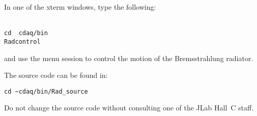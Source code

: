 {In one of the xterm windows, type the following:

\texttt{\\
	cd ~cdaq/bin\\
	Radcontrol\\
}

and use the menu session to control the motion of the
Bremsstrahlung radiator.

The source code can be found in:

\texttt{cd \textasciitilde{}cdaq/bin/Rad\_source}

Do not change the source code without consulting
one of the JLab Hall~C staff.
}
